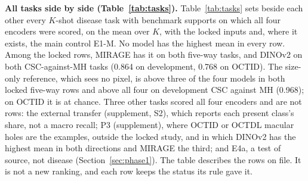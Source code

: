\documentclass[conference]{IEEEtran}
\begin{document}
\textbf{All tasks side by side (Table~\ref{tab:tasks}).} Table~\ref{tab:tasks} sets beside each other every $K$-shot disease task with benchmark supports on which all four encoders were scored, on the mean over $K$, with the locked inputs and, where it exists, the main control E1-M. No model has the highest mean in every row. Among the locked rows, MIRAGE has it on both five-way tasks, and DINOv2 on both CSC-against-MH tasks (0.864 on development, 0.768 on OCTID). The size-only reference, which sees no pixel, is above three of the four models in both locked five-way rows and above all four on development CSC against MH (0.968); on OCTID it is at chance. Three other tasks scored all four encoders and are not rows: the external transfer (supplement, S2), which reports each present class's share, not a macro recall; P3 (supplement), where OCTID or OCTDL macular holes are the examples, outside the locked study, and in which DINOv2 has the highest mean in both directions and MIRAGE the third; and E4a, a test of source, not disease (Section~\ref{sec:phase1}). The table describes the rows on file. It is not a new ranking, and each row keeps the status its rule gave it.
\end{document}
